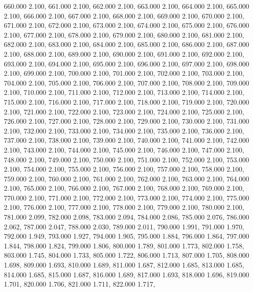 660.000 2.100, 
661.000 2.100, 
662.000 2.100, 
663.000 2.100, 
664.000 2.100, 
665.000 2.100, 
666.000 2.100, 
667.000 2.100, 
668.000 2.100, 
669.000 2.100, 
670.000 2.100, 
671.000 2.100, 
672.000 2.100, 
673.000 2.100, 
674.000 2.100, 
675.000 2.100, 
676.000 2.100, 
677.000 2.100, 
678.000 2.100, 
679.000 2.100, 
680.000 2.100, 
681.000 2.100, 
682.000 2.100, 
683.000 2.100, 
684.000 2.100, 
685.000 2.100, 
686.000 2.100, 
687.000 2.100, 
688.000 2.100, 
689.000 2.100, 
690.000 2.100, 
691.000 2.100, 
692.000 2.100, 
693.000 2.100, 
694.000 2.100, 
695.000 2.100, 
696.000 2.100, 
697.000 2.100, 
698.000 2.100, 
699.000 2.100, 
700.000 2.100, 
701.000 2.100, 
702.000 2.100, 
703.000 2.100, 
704.000 2.100, 
705.000 2.100, 
706.000 2.100, 
707.000 2.100, 
708.000 2.100, 
709.000 2.100, 
710.000 2.100, 
711.000 2.100, 
712.000 2.100, 
713.000 2.100, 
714.000 2.100, 
715.000 2.100, 
716.000 2.100, 
717.000 2.100, 
718.000 2.100, 
719.000 2.100, 
720.000 2.100, 
721.000 2.100, 
722.000 2.100, 
723.000 2.100, 
724.000 2.100, 
725.000 2.100, 
726.000 2.100, 
727.000 2.100, 
728.000 2.100, 
729.000 2.100, 
730.000 2.100, 
731.000 2.100, 
732.000 2.100, 
733.000 2.100, 
734.000 2.100, 
735.000 2.100, 
736.000 2.100, 
737.000 2.100, 
738.000 2.100, 
739.000 2.100, 
740.000 2.100, 
741.000 2.100, 
742.000 2.100, 
743.000 2.100, 
744.000 2.100, 
745.000 2.100, 
746.000 2.100, 
747.000 2.100, 
748.000 2.100, 
749.000 2.100, 
750.000 2.100, 
751.000 2.100, 
752.000 2.100, 
753.000 2.100, 
754.000 2.100, 
755.000 2.100, 
756.000 2.100, 
757.000 2.100, 
758.000 2.100, 
759.000 2.100, 
760.000 2.100, 
761.000 2.100, 
762.000 2.100, 
763.000 2.100, 
764.000 2.100, 
765.000 2.100, 
766.000 2.100, 
767.000 2.100, 
768.000 2.100, 
769.000 2.100, 
770.000 2.100, 
771.000 2.100, 
772.000 2.100, 
773.000 2.100, 
774.000 2.100, 
775.000 2.100, 
776.000 2.100, 
777.000 2.100, 
778.000 2.100, 
779.000 2.100, 
780.000 2.100, 
781.000 2.099, 
782.000 2.098, 
783.000 2.094, 
784.000 2.086, 
785.000 2.076, 
786.000 2.062, 
787.000 2.047, 
788.000 2.030, 
789.000 2.011, 
790.000 1.991, 
791.000 1.970, 
792.000 1.949, 
793.000 1.927, 
794.000 1.905, 
795.000 1.884, 
796.000 1.864, 
797.000 1.844, 
798.000 1.824, 
799.000 1.806, 
800.000 1.789, 
801.000 1.773, 
802.000 1.758, 
803.000 1.745, 
804.000 1.733, 
805.000 1.722, 
806.000 1.713, 
807.000 1.705, 
808.000 1.698, 
809.000 1.693, 
810.000 1.689, 
811.000 1.687, 
812.000 1.685, 
813.000 1.685, 
814.000 1.685, 
815.000 1.687, 
816.000 1.689, 
817.000 1.693, 
818.000 1.696, 
819.000 1.701, 
820.000 1.706, 
821.000 1.711, 
822.000 1.717, 
